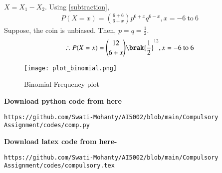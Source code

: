 \documentclass[journal,12pt,twocolumn]{IEEEtran}
\begin{document}
$X=X_1-X_2$. Using \eqref{subtraction},
\begin{align}
    P(X=x) = \binom{6+6}{6+x} p^{6+x} q^{6-x}, x= -6\ \text{to}\ 6 
\end{align}
Suppose, the coin is unbiased. Then, $p=q= \frac{1}{2}$.
\begin{align}
    \therefore P(X=x) = \binom{12}{6+x}\brak{\frac{1}{2}}^{12}, x= -6\ \text{to}\ 6 
\end{align}
\begin{figure}[!ht]
\centering
\texttt{[image: plot\_binomial.png]}
\caption{Binomial Frequency plot}
\label{fig:binomial plot}
\end{figure}
\textbf{Download python code from here}\\
\begin{lstlisting}
https://github.com/Swati-Mohanty/AI5002/blob/main/Compulsory Assignment/codes/comp.py
\end{lstlisting}
\textbf{Download latex code from here-}\\
\begin{lstlisting}
https://github.com/Swati-Mohanty/AI5002/blob/main/Compulsory Assignment/codes/compulsory.tex
\end{lstlisting}
\end{document}
